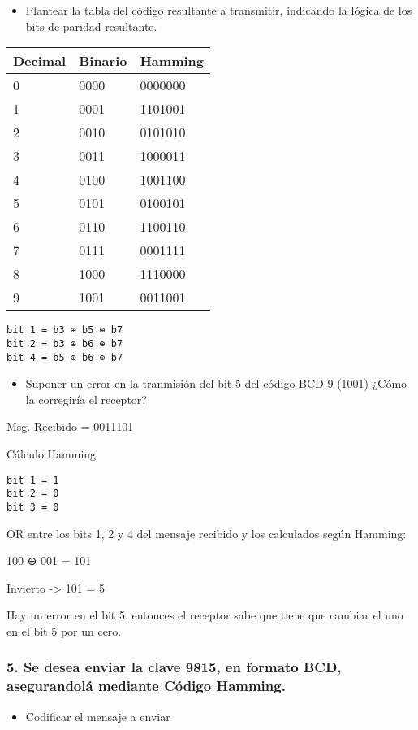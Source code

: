 \documentclass{article}
\begin{document}
\begin{itemize}
\itemsep1pt\parskip0pt
\item
  Plantear la tabla del código resultante a transmitir, indicando la
  lógica de los bits de paridad resultante.
\end{itemize}

\begin{longtable}[c]{@{}lll@{}}
\toprule
Decimal & Binario & Hamming\tabularnewline
\midrule
\endhead
0 & 0000 & 0000000\tabularnewline
1 & 0001 & 1101001\tabularnewline
2 & 0010 & 0101010\tabularnewline
3 & 0011 & 1000011\tabularnewline
4 & 0100 & 1001100\tabularnewline
5 & 0101 & 0100101\tabularnewline
6 & 0110 & 1100110\tabularnewline
7 & 0111 & 0001111\tabularnewline
8 & 1000 & 1110000\tabularnewline
9 & 1001 & 0011001\tabularnewline
\bottomrule
\end{longtable}

\begin{verbatim}
bit 1 = b3 ⊕ b5 ⊕ b7
bit 2 = b3 ⊕ b6 ⊕ b7
bit 4 = b5 ⊕ b6 ⊕ b7
\end{verbatim}

\begin{itemize}
\itemsep1pt\parskip0pt
\item
  Suponer un error en la tranmisión del bit 5 del código BCD 9 (1001)
  ¿Cómo la corregiría el receptor?
\end{itemize}

Msg. Recibido = 0011101

Cálculo Hamming

\begin{verbatim}
bit 1 = 1
bit 2 = 0
bit 3 = 0
\end{verbatim}

OR entre los bits 1, 2 y 4 del mensaje recibido y los calculados según
Hamming:

100 ⊕ 001 = 101

Invierto -\textgreater{} 101 = 5

Hay un error en el bit 5, entonces el receptor sabe que tiene que
cambiar el uno en el bit 5 por un cero.

\subsubsection{5. Se desea enviar la clave 9815, en formato BCD,
asegurandolá mediante Código
Hamming.}\label{se-desea-enviar-la-clave-9815-en-formato-bcd-asegurandoluxe1-mediante-cuxf3digo-hamming.}

\begin{itemize}
\itemsep1pt\parskip0pt
\item
  Codificar el mensaje a enviar
\end{itemize}
\end{document}
